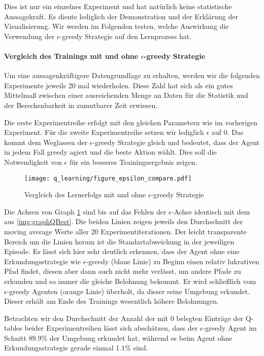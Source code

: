 Dies ist nur ein einzelnes Experiment und hat natürlich keine statistische Aussagekraft. Es diente lediglich der Demonstration und der Erklärung der Visualisierung. Wir werden im Folgenden testen, welche Auswirkung die Verwendung der $ \epsilon $-greedy Strategie auf den Lernprozess hat.

\paragraph{Vergleich des Trainings mit und ohne $ \epsilon $-greedy Strategie}
Um eine aussagenkräftigere Datengrundlage zu erhalten, werden wir die folgenden Experimente jeweils 20 mal wiederholen. Diese Zahl hat sich als ein gutes Mittelmaß zwischen einer ausreichenden Menge an Daten für die Statistik und der Berechenbarkeit in zumutbarer Zeit erwiesen.

Die erste Experimentreihe erfolgt mit den gleichen Parametern wie im vorherigen Experiment. Für die zweite Experimentreihe setzen wir lediglich $ \epsilon $ auf 0. Das kommt dem Weglassen der $ \epsilon $-greedy Strategie gleich und bedeutet, dass der Agent in jedem Fall greedy agiert und die beste Aktion wählt. Dies soll die Notwendigkeit von $ \epsilon $ für ein besseres Trainingsergebnis zeigen.
\begin{figure}[H]
    \centering
    \texttt{[image: q\_learning/figure\_epsilon\_compare.pdf]}
    \caption{Vergleich des Lernerfolgs mit und ohne $ \epsilon $-greedy Strategie} \label{img:graphQEpsComp}
\end{figure}
Die Achsen von Graph \ref{img:graphQEpsComp} sind bis auf das Fehlen der $ \epsilon $-Achse identisch mit dem aus \ref{img:graphQBest}. Die beiden Linien zeigen jeweils den Durchschnitt der moving average Werte aller 20 Experimentiterationen. Der leicht transparente Bereich um die Linien herum ist die Standartabweichung in der jeweiligen Episode.
Es lässt sich hier sehr deutlich erkennen, dass der Agent ohne eine Erkundungsstrategie wie $ \epsilon $-greedy (blaue Linie) zu Beginn einen relativ lukrativen Pfad findet, diesen aber dann auch nicht mehr verlässt, um andere Pfade zu erkunden und so immer die gleiche Belohnung bekommt. Er wird schließlich vom $ \epsilon $-greedy Agenten (orange Linie) überholt, da dieser seine Umgebung erkundet. Dieser erhält am Ende des Trainings wesentlich höhere Belohnungen.

Betrachten wir den Durchschnitt der Anzahl der mit 0 belegten Einträge der Q-tables beider Experimentreihen lässt sich abschätzen, dass der $ \epsilon $-greedy Agent im Schnitt $ 89.9\% $ der Umgebung erkundet hat, während es beim Agent ohne Erkundungsstrategie gerade einmal $ 1.1\% $ sind.

